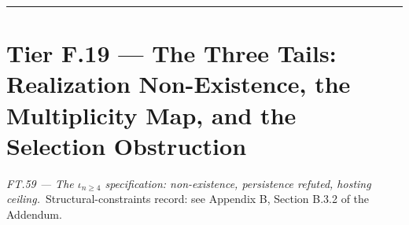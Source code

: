\begin{theorem}
\vspace{2pt}\noindent\rule{\textwidth}{0.4pt}\vspace{2pt}

\end{theorem}

\section[Tier F.19 — The Three Tails: Realization Non-Existence, the…]{\texorpdfstring{Tier F.19 — The Three Tails: Realization Non-Existence, the Multiplicity Map, and the Selection Obstruction}{Tier F.19 - The Three Tails: Realization Non-Existence, the Multiplicity Map, and the Selection Obstruction}}

\medskip\noindent\textit{\texorpdfstring{FT.59 — The $\iota_{n\ge4}$ specification: non-existence, persistence refuted, hosting ceiling}{FT.59 - The specification: non-existence, persistence refuted, hosting ceiling}.}\ Structural-constraints record: see Appendix B, Section B.3.2 of the Addendum.\par\medskip

